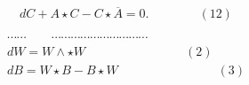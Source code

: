 \documentclass{article}
\begin{document}
\begin{equation}
d C + A \star C - C \star \overline { A } = 0. \qquad \qquad ( 1 2 )
\end{equation}


\begin{equation}
\begin{array} { c } { \cdots \cdots \qquad \cdots \cdots \cdots \cdots \cdots \cdots \cdots \cdots \cdots \cdots } \\ { d W = W \wedge \star W \qquad \qquad \qquad \qquad ( 2 ) } \\ { d B = W \star B - B \star W \qquad \qquad \qquad \qquad ( 3 ) } \end{array}
\end{equation}
\end{document}
